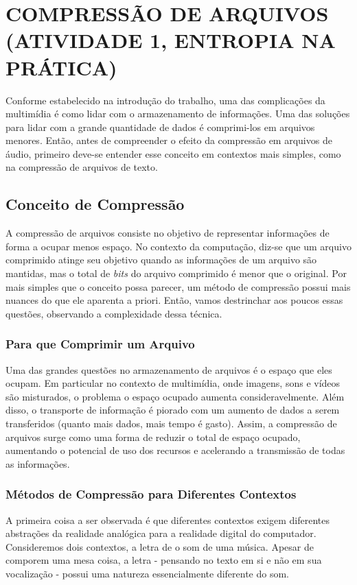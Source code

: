 \captionsetup{justification=centering,margin=0cm}

\chapter[COMPRESSÃO DE ARQUIVOS (ATIVIDADE 1, ENTROPIA NA PRÁTICA)]{COMPRESSÃO DE ARQUIVOS (ATIVIDADE 1, ENTROPIA NA PRÁTICA)}
Conforme estabelecido na introdução do trabalho, uma das complicações da multimídia é como lidar com o armazenamento de informações. Uma das soluções para lidar com a grande quantidade de dados é comprimi-los em arquivos menores. Então, antes de compreender o efeito da compressão em arquivos de áudio, primeiro deve-se entender esse conceito em contextos mais simples, como na compressão de arquivos de texto.

\section{Conceito de Compressão}
A compressão de arquivos consiste no objetivo de representar informações de forma a ocupar menos espaço. No contexto da computação, diz-se que um arquivo comprimido atinge seu objetivo quando as informações de um arquivo são mantidas, mas o total de \textit{bits} do arquivo comprimido é menor que o original. Por mais simples que o conceito possa parecer, um método de compressão possui mais nuances do que ele aparenta a priori. Então, vamos destrinchar aos poucos essas questões, observando a complexidade dessa técnica.

\subsection{Para que Comprimir um Arquivo}
Uma das grandes questões no armazenamento de arquivos é o espaço que eles ocupam. Em particular no contexto de multimídia, onde imagens, sons e vídeos são misturados, o problema o espaço ocupado aumenta consideravelmente. Além disso, o transporte de informação é piorado com um aumento de dados a serem transferidos (quanto mais dados, mais tempo é gasto). Assim, a compressão de arquivos surge como uma forma de reduzir o total de espaço ocupado, aumentando o potencial de uso dos recursos e acelerando a transmissão de todas as informações.  

\subsection{Métodos de Compressão para Diferentes Contextos}
A primeira coisa a ser observada é que diferentes contextos exigem diferentes abstrações da realidade analógica para a realidade digital do computador. Consideremos dois contextos, a letra de o som de uma música. Apesar de comporem uma mesa coisa, a letra - pensando no texto em si e não em sua vocalização - possui uma natureza essencialmente diferente do som. 

